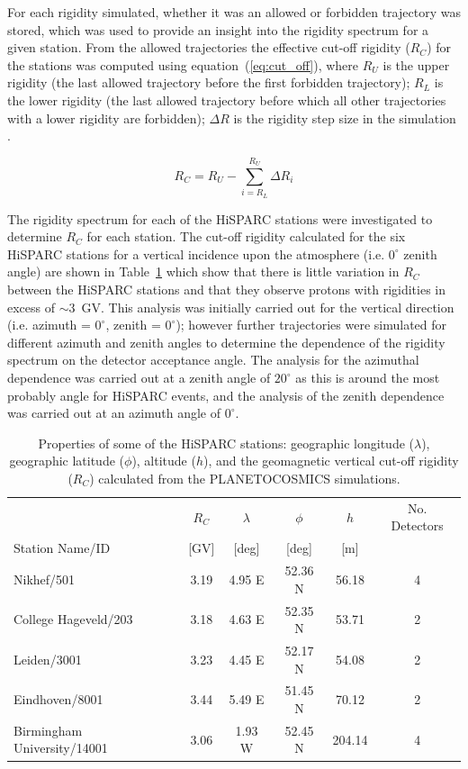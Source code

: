 For each rigidity simulated, whether it was an allowed or forbidden trajectory was stored, which was used to provide an insight into the rigidity spectrum for a given station. From the allowed trajectories the effective cut-off rigidity ($R_C$) for the stations was computed using equation~(\ref{eq:cut_off}), where $R_U$ is the upper rigidity (the last allowed trajectory before the first forbidden trajectory); $R_L$ is the lower rigidity (the last allowed trajectory before which all other trajectories with a lower rigidity are forbidden); $\Delta R$ is the rigidity step size in the simulation \citep{desorgher_planetocosmics_2006, herbst_influence_2013}.

\begin{equation}
\label{eq:cut_off}
R_C = R_U - \sum_{i = R_L}^{R_U} \Delta R_i
\end{equation}

The rigidity spectrum for each of the HiSPARC stations were investigated to determine $R_C$ for each station. The cut-off rigidity calculated for the six HiSPARC stations for a vertical incidence upon the atmosphere (i.e. $0^\circ$ zenith angle) are shown in Table~\ref{tab:HS_stns} which show that there is little variation in $R_C$ between the HiSPARC stations and that they observe protons with rigidities in excess of $\sim 3$~GV. This analysis was initially carried out for the vertical direction (i.e. azimuth = $0^\circ$, zenith = $0^\circ$); however further trajectories were simulated for different azimuth and zenith angles to determine the dependence of the rigidity spectrum on the detector acceptance angle. The analysis for the azimuthal dependence was carried out at a zenith angle of $20^\circ$ as this is around the most probably angle for HiSPARC events, and the analysis of the zenith dependence was carried out at an azimuth angle of $0^\circ$.


\begin{table}
	\begin{center}
		\caption{Properties of some of the HiSPARC stations: geographic longitude ($\lambda$), geographic latitude ($\phi$), altitude ($h$), and the geomagnetic vertical cut-off rigidity ($R_C$) calculated from the PLANETOCOSMICS simulations.}
		\label{tab:HS_stns}
		\begin{tabular}{l c c c c c}
			\hline
			& $R_C$  & $\lambda$ & $\phi$  & $h$  & No. Detectors\\
			Station Name/ID & [GV] & [deg] & [deg] & [m]  & \\
			\hline
			Nikhef/501 & 3.19 & 4.95 E & 52.36 N & 56.18 & 4 \\
			College Hageveld/203 & 3.18 & 4.63 E  & 52.35 N & 53.71  & 2 \\
			Leiden/3001 & 3.23 & 4.45 E & 52.17 N & 54.08 & 2 \\
			Eindhoven/8001  & 3.44 & 5.49 E & 51.45 N & 70.12 & 2 \\
			Birmingham University/14001  & 3.06 & 1.93 W & 52.45 N & 204.14 & 4  \\
			\hline
		\end{tabular}
	\end{center}
\end{table}

